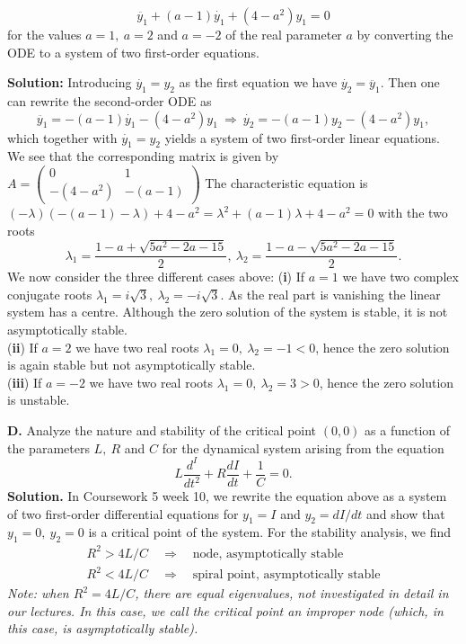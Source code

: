 \documentclass[11pt,a4paper,twoside]{article}
\begin{document}
	$$
	\ddot{y_1} + (a - 1)\dot{y_1} + (4 - a^2)y_1 = 0
	$$
	for the values $a = 1,\ a= 2$ and $a = -2$ of the real parameter $a$ by converting the ODE to a system of two first-order equations.\par
	\textbf{Solution:} Introducing $\dot{y_1} = y_2$ as the first equation we have $\dot{y_2} = \ddot{y_1}$. Then one can rewrite the second-order ODE as
	$$
	\ddot{y_1} = -(a - 1)\dot{y_1} - (4 - a^2)y_1\ \Rightarrow \ \dot{y_2} = -(a - 1)y_2 - (4 - a^2)y_1,
	$$
	which together with $\dot{y_1} = y_2$ yields a system of two first-order linear equations.\\
	We see that the corresponding matrix is given by
	$
	A =
	\begin{pmatrix}
		0 & 1\\
		-(4 - a^2) & -(a - 1)
	\end{pmatrix}
	$
	The characteristic equation is $(-\lambda)(-(a - 1) - \lambda) + 4 - a^2 = \lambda^2 + (a - 1)\lambda + 4 - a^2 = 0$ with the two roots
	$$
	\lambda_1 = \frac{1 - a + \sqrt{5a^2 - 2a - 15}}{2},\ \lambda_2 = \frac{1 - a - \sqrt{5a^2 - 2a - 15}}{2}.
	$$
	We now consider the three different cases above:
	(\textbf{i}) If $a = 1$  we have two complex conjugate roots $\lambda_1 = i\sqrt{3},\ \lambda_2 = -i\sqrt{3}$. As the real part is vanishing the linear system has a centre. Although the zero solution of the system is stable, it is not asymptotically stable.\\
	(\textbf{ii}) If $a = 2$ we have two real roots $\lambda_1 = 0,\ \lambda_2 = -1 < 0$, hence the zero solution is again stable but not asymptotically stable.\\
	(\textbf{iii}) If $a = -2$ we have two real roots $\lambda_1 = 0,\ \lambda_2 = 3 > 0$, hence the zero solution is unstable.\par
	\textbf{D.} Analyze the nature and stability of the critical point $(0, 0)$ as a function of the parameters $L,\ R$ and $C$ for the dynamical system arising from the equation
	$$
	L \frac{d^I}{dt^2} + R\frac{dI}{dt} + \frac{1}{C} = 0.
	$$
	\textbf{Solution.} In Coursework 5 week 10, we rewrite the equation above as a system of two first-order differential equations for $y_1 = I$ and $y_2 = dI/dt$ and show that $y_1 = 0,\ y_2 = 0$ is a critical point of the system. For the stability analysis, we find
	\begin{align*}
		R^2 > 4L/C \quad \Rightarrow \quad \text{node, asymptotically stable}\\
		R^2 < 4L/C \quad \Rightarrow \quad \text{spiral point, asymptotically stable}
	\end{align*}
	\textit{Note: when $R^2 = 4L/C$, there are equal eigenvalues, not investigated in detail in our lectures. In this case, we call the critical point an improper node (which, in this case, is asymptotically stable).}
\end{document}
